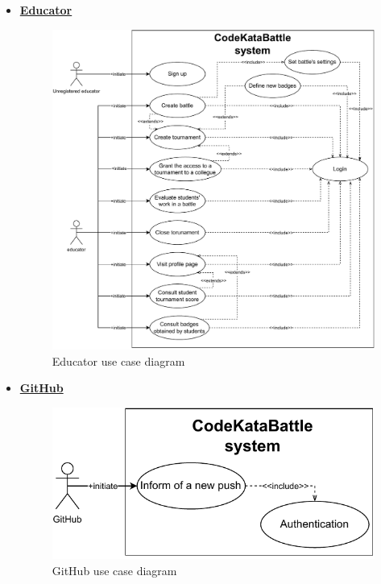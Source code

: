 \documentclass{article}
\begin{document}
{\begin{itemize}
    \item \underline{\large{\textbf{Educator}}}
          \begin{figure}[H]
              \centering
              \includegraphics[scale=0.55]{images/3.2.2_UseCaseDiagrams/CaseDiagramEducator.pdf}
              \caption{Educator use case diagram}
              \label{fig:educatorUseCaseDiagram}
          \end{figure}
    \item \underline{\large{\textbf{GitHub}}}
          \begin{figure}[H]
              \centering
              \includegraphics[scale=0.55]{images/3.2.2_UseCaseDiagrams/CaseDiagramGitHub.pdf}
              \caption{GitHub use case diagram}
              \label{fig:gitHubUseCaseDiagram}
          \end{figure}


\end{itemize}}
\end{document}
